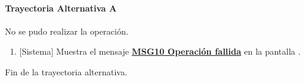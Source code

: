 \paragraph{Trayectoria Alternativa A} \label{W-PR-CU1.1.4:TA}
    No se pudo realizar la operación.
	\begin{enumerate}[label=A\arabic*.]
		\item {[Sistema]} Muestra el mensaje \hyperref[MSG10]{\bf MSG10 Operación fallida}  en la pantalla \textbf{}.
	\end{enumerate}
	Fin de la trayectoria alternativa.